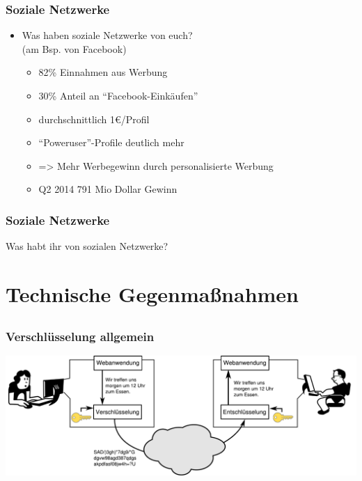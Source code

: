 \documentclass[12pt]{beamer}
\begin{document}
\begin{frame}
  \frametitle{Soziale Netzwerke}

  \begin{itemize}
    \item Was haben soziale Netzwerke von euch?\\(am Bsp. von Facebook)
      \begin{itemize}
        \item<2-> 82\% Einnahmen aus Werbung
        \item<3-> 30\% Anteil an "`Facebook-Einkäufen"'
        \item<4-> durchschnittlich 1€/Profil
        \item<5-> "`Poweruser"'-Profile deutlich mehr
        \item<6-> => Mehr Werbegewinn durch personalisierte Werbung
	\item<7-> Q2 2014 791 Mio Dollar Gewinn
      \end{itemize}
  \end{itemize}
\end{frame}

\begin{frame}
  \frametitle{Soziale Netzwerke}

  \begin{center} \Large
     Was habt ihr von sozialen Netzwerke?
  \end{center}
\end{frame}

\section{Technische Gegenmaßnahmen}
\subsection{}

\begin{frame}
    \frametitle{Verschlüsselung allgemein}
    \begin{center}
	\includegraphics[width=\textwidth]{img/krypto.pdf}
    \end{center}	
\end{frame}
\end{document}
